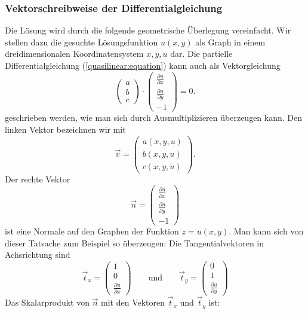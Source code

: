 \subsubsection{Vektorschreibweise der Differentialgleichung}
Die Lösung wird durch die folgende geometrische Überlegung vereinfacht.
Wir stellen dazu die gesuchte Lösungsfunktion $u(x,y)$ als Graph
in einem dreidimensionalen Koordinatensystem $x,y,u$ dar.
Die partielle Differentialgleichung (\ref{quasilinear:equation})
kann auch als Vektorgleichung
\begin{equation}
\begin{pmatrix}a\\b\\c\end{pmatrix}
\cdot
\begin{pmatrix}
\frac{\partial u}{\partial x}\\
\frac{\partial u}{\partial y}\\
-1
\end{pmatrix}
=0.
\label{quasilinear:vektorform}
\end{equation}
geschrieben werden, wie man sich durch Ausmultiplizieren überzeugen
kann.
Den linken Vektor bezeichnen wir mit
\[
\vec v=\begin{pmatrix}
a(x,y,u)\\
b(x,y,u)\\
c(x,y,u)
\end{pmatrix}.
\]
Der rechte Vektor
\[
\vec n=
\begin{pmatrix}
\frac{\partial u}{\partial x}\\
\frac{\partial u}{\partial y}\\
-1
\end{pmatrix}
\]
ist eine Normale auf den Graphen der Funktion
$z=u(x,y)$. Man kann sich von dieser Tatsache zum Beispiel so 
überzeugen: Die Tangentialvektoren in Achsrichtung sind
\[
\vec t_x
=
\begin{pmatrix}1\\0\\\frac{\partial u}{\partial x}\end{pmatrix}
\qquad
\text{und}
\qquad
\vec t_y
=
\begin{pmatrix}0\\1\\\frac{\partial u}{\partial y}\end{pmatrix}
\]
Das Skalarprodukt von $\vec n$ mit den Vektoren $\vec t_x$ und $\vec t_y$
ist:

